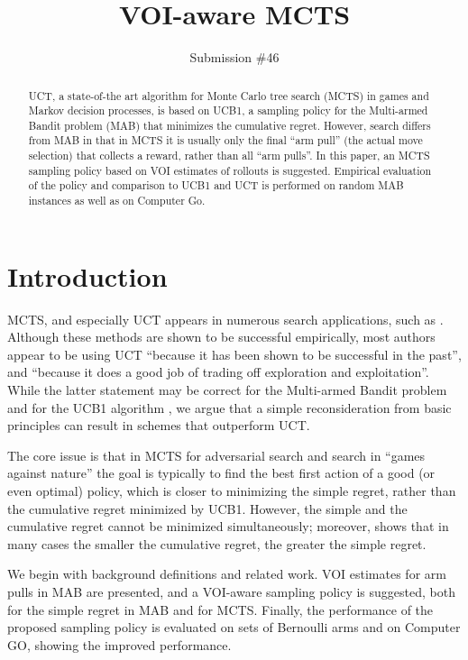 \documentclass{ecai2012}
\title{VOI-aware MCTS}
\author {Submission \#46}
\begin{document}
\maketitle

\begin{abstract}
UCT, a state-of-the art algorithm for Monte Carlo tree search (MCTS)
in games and Markov decision processes, is based on UCB1, a sampling
policy for the Multi-armed Bandit problem (MAB) that 
minimizes the cumulative regret.  However, search differs from MAB in
that in MCTS it is usually only the final ``arm pull'' (the actual
move selection) that collects a reward, rather than all ``arm pulls''.
In this paper, an MCTS sampling policy based on VOI estimates of rollouts is
suggested. Empirical evaluation of the policy and comparison to
UCB1 and UCT is performed on random MAB instances
as well as on Computer Go.
\end{abstract}

\section{Introduction}

MCTS, and especially UCT \cite{Kocsis.uct} appears in numerous search
applications, such as \cite{Eyerich.ctp}. Although these methods are
shown to be successful empirically, most authors appear to be using
UCT ``because it has been shown to be successful in the past'', and
``because it does a good job of trading off exploration and
exploitation''. While the latter statement may be correct for the
Multi-armed Bandit problem and for the UCB1 algorithm \cite{Auer.ucb},
we argue that a simple reconsideration from basic principles can
result in schemes that outperform UCT.

The core issue is that in MCTS for adversarial search and search in
``games against nature'' the goal is typically to find the best
first action of a good (or even optimal) policy, which is closer to
minimizing the simple regret, rather than the cumulative regret
minimized by UCB1.  However, the simple and the cumulative regret
cannot be minimized simultaneously; moreover, \cite{Bubeck.pure} shows
that in many cases the smaller the cumulative regret, the greater the
simple regret.

We begin with background definitions and related work.  VOI estimates
for arm pulls in MAB are presented, and a VOI-aware sampling policy is
suggested, both for the simple regret in MAB and for MCTS.  Finally,
the performance of the proposed sampling policy is evaluated on sets
of Bernoulli arms and on Computer GO, showing the improved
performance.
\end{document}
